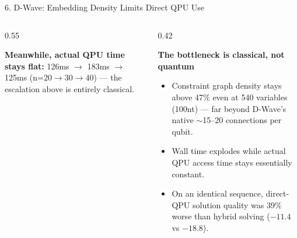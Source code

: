 \documentclass[aspectratio=169,10pt]{beamer}
\begin{document}
\begin{frame}{6. D-Wave: Embedding Density Limits Direct QPU Use}
  \begin{columns}[T]
    \begin{column}{0.55\textwidth}
      \begin{center}
      \end{center}
      \begin{cardbox}
      \footnotesize\textbf{\color{navy}Meanwhile, actual QPU time stays flat:} 126ms $\rightarrow$ 183ms $\rightarrow$ 125ms (n=20$\to$30$\to$40) --- the escalation above is entirely classical.
      \end{cardbox}
    \end{column}
    \begin{column}{0.42\textwidth}
      \begin{cardbox}
      \textbf{\color{navy}The bottleneck is classical, not quantum}
      \vspace{4pt}
      \begin{itemize}\footnotesize
        \item Constraint graph density stays above 47\% even at 540 variables (100nt) --- far beyond D-Wave's native $\sim$15--20 connections per qubit.
        \item Wall time explodes while actual QPU access time stays essentially constant.
        \item On an identical sequence, direct-QPU solution quality was 39\% worse than hybrid solving ($-11.4$ vs $-18.8$).
      \end{itemize}
      \end{cardbox}
    \end{column}
  \end{columns}
\end{frame}
\end{document}

